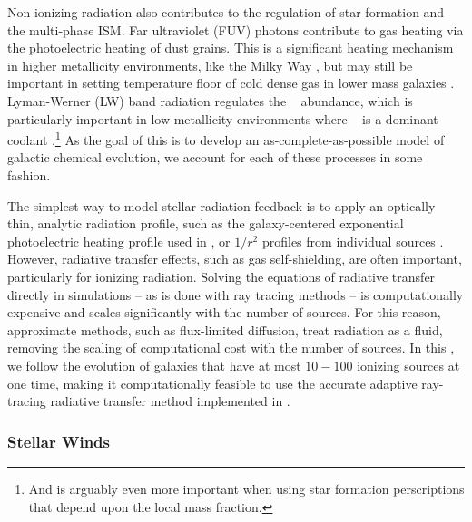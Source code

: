 Non-ionizing radiation also contributes to the regulation of star formation and the multi-phase ISM. Far ultraviolet (FUV) photons contribute to gas heating via the photoelectric heating of dust grains. This is a significant heating mechanism in higher metallicity environments, like the Milky Way \citep{Parravano2003,Wolfire2003}, but may still be important in setting temperature floor of cold dense gas in lower mass galaxies \citep{Forbes2016,Hu2017}. Lyman-Werner (LW) band radiation regulates the \Hmolecular~ abundance, which is particularly important in low-metallicity environments where \Hmolecular~ is a dominant coolant \citep[e.g.][]{Glover2003,Wolcott-Green2012}.\footnote{And is arguably even more important when using star formation perscriptions that depend upon the local \Hmolecular mass fraction.} As the goal of this \dissertation is to develop an as-complete-as-possible model of galactic chemical evolution, we account for each of these processes in some fashion.

The simplest way to model stellar radiation feedback is to apply an optically thin, analytic radiation profile, such as the galaxy-centered exponential photoelectric heating profile used in \cite{Tasker2009}, or $1/r^2$ profiles from individual sources \citep[e.g.][]{Forbes2016}. However, radiative transfer effects, such as gas self-shielding, are often important, particularly for ionizing radiation. Solving the equations of radiative transfer directly in simulations -- as is done with ray tracing methods -- is computationally expensive and scales significantly with the number of sources. For this reason, approximate methods, such as flux-limited diffusion, treat radiation as a fluid, removing the scaling of computational cost with the number of sources. In this \dissertation, we follow the evolution of galaxies that have at most $10 - 100$ ionizing sources at one time, making it computationally feasible to use the accurate adaptive ray-tracing radiative transfer method implemented in .

\subsubsection{Stellar Winds}
\label{intro:sec:stellarwinds}

